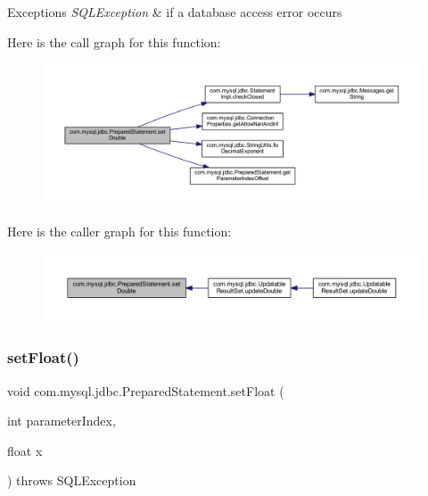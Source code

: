 \begin{DoxyExceptions}{Exceptions}
{\em S\+Q\+L\+Exception} & if a database access error occurs \\
\hline
\end{DoxyExceptions}
Here is the call graph for this function\+:
\nopagebreak
\begin{figure}[H]
\begin{center}
\leavevmode
\includegraphics[width=350pt]{classcom_1_1mysql_1_1jdbc_1_1_prepared_statement_a9be27733e4e54e675dd6eaf238380e02_cgraph}
\end{center}
\end{figure}
Here is the caller graph for this function\+:
\nopagebreak
\begin{figure}[H]
\begin{center}
\leavevmode
\includegraphics[width=350pt]{classcom_1_1mysql_1_1jdbc_1_1_prepared_statement_a9be27733e4e54e675dd6eaf238380e02_icgraph}
\end{center}
\end{figure}
\mbox{\label{classcom_1_1mysql_1_1jdbc_1_1_prepared_statement_a68b6271f340188dc794c5bc4418705cb}} 
\subsubsection{\texorpdfstring{set\+Float()}{setFloat()}}
{\footnotesize\ttfamily void com.\+mysql.\+jdbc.\+Prepared\+Statement.\+set\+Float (\begin{DoxyParamCaption}\item[{int}]{parameter\+Index,  }\item[{float}]{x }\end{DoxyParamCaption}) throws S\+Q\+L\+Exception}

